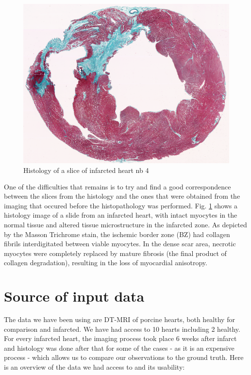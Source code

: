 \begin{figure}[h!]
    \centering
    \includegraphics[width=\textwidth]{figures/Gip4_histology}
    \caption{Histology of a slice of infarcted heart nb 4}
    \label{fig:histology_pig_4}
\end{figure}

One of the difficulties that remains is to try and find a good correspondence between the slices from the histology and the ones that were obtained from the imaging that occured before the histopathology was performed. Fig. \ref{fig:histology_pig_4} shows a histology image of a slide from an infarcted heart, with intact myocytes in the normal tissue and altered tissue microstructure in the infarcted zone. As depicted by the Masson Trichrome stain, the ischemic border zone (BZ) had collagen fibrils interdigitated between viable myocytes. In the dense scar area, necrotic myocytes were completely replaced by mature fibrosis (the final product of collagen degradation), resulting in the loss of myocardial anisotropy.

\section{Source of input data}

The data we have been using are DT-MRI of porcine hearts, both healthy for comparison and infarcted. We have had access to 10 hearts including 2 healthy. For every infarcted heart, the imaging process took place 6 weeks after infarct and histology was done after that for some of the cases - as it is an expensive process - which allows us to compare our observations to the ground truth. Here is an overview of the data we had access to and its usability:


